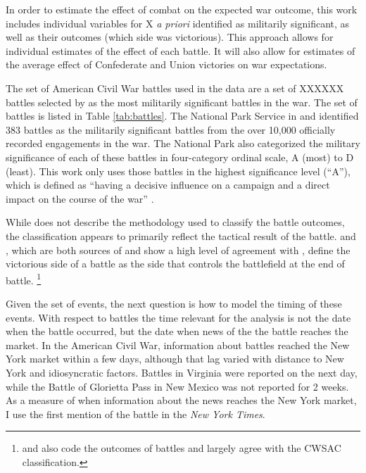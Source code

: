 In order to estimate the effect of combat on the expected war outcome, this work includes individual variables for X \textit{a priori} identified as militarily significant, as well as their outcomes (which side was victorious).
This approach allows for individual estimates of the effect of each battle.
It will also allow for estimates of the average effect of Confederate and Union victories on war expectations.

The set of American Civil War battles used in the data are a set of XXXXXX battles selected by \textcite{CWSAC1993} as the most militarily significant battles in the war.
The set of battles is listed in Table \ref{tab:battles}.
The National Park Service in \textcite{CWSAC1993} and \textcite{CWSAC1993b} identified 383 battles as the militarily significant battles from the over 10,000 officially recorded engagements in the war.
The National Park also categorized the military significance of each of these battles in four-category ordinal scale, A (most) to D (least).
This work only uses those battles in the highest significance level (``A''), which is defined as ``having a decisive influence on a campaign and a direct impact on the course of the war'' \parencite{CWSAC1993}.

While \textcite{CWSAC1993} does not describe the methodology used to classify the battle outcomes, the classification appears to primarily reflect the tactical result of the battle.
\textcite{fox1898regimental} and \textcite{Livermore1900}, which are both sources of and show a high level of agreement with \textcite{CWSAC1993}, define the victorious side of a battle as the side that controls the battlefield at the end of battle.%
\footnote{\textcite{Bodart1908} and \textcite{cdb90} also code the outcomes of battles and largely agree with the CWSAC classification.} %

Given the set of events, the next question is how to model the timing of these events.
With respect to battles the time relevant for the analysis is not the date when the battle occurred, but the date when news of the the battle reaches the market.
In the American Civil War, information about battles reached the New York market within a few days, although that lag varied with distance to New York and idiosyncratic factors.
Battles in Virginia were reported on the next day, while the Battle of Glorietta Pass in New Mexico was not reported for 2 weeks.
As a measure of when information about the news reaches the New York market, I use the first mention of the battle in the \textit{New York Times}.

